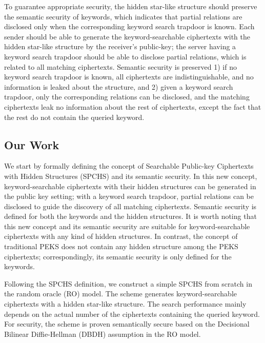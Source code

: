 \documentclass[10pt,twocolumn,twoside]{IEEEtran}
\begin{document}
To guarantee appropriate security, the hidden star-like structure should 
preserve the semantic security of keywords, which indicates that partial relations are disclosed only when the corresponding keyword search trapdoor is known. Each sender should be able to generate the keyword-searchable ciphertexts with the hidden star-like structure by the receiver's public-key; the server having a keyword search trapdoor should be able to disclose partial relations, which is related to all matching ciphertexts. Semantic security is preserved 1) if no keyword search trapdoor is
known, all ciphertexts are indistinguishable, and no information is leaked about the structure, and 2) given a keyword search trapdoor, only the corresponding relations can be disclosed, and the matching ciphertexts leak no information about the rest of ciphertexts, except the fact that the rest do not contain the queried keyword.

\subsection{Our Work}

We start by formally defining the concept of Searchable Public-key Ciphertexts with Hidden Structures (SPCHS) and its semantic security. In this new concept, keyword-searchable ciphertexts with their hidden structures can be generated in the public key setting; with a keyword search trapdoor, partial relations can be disclosed to guide the discovery of all matching ciphertexts. Semantic security is defined for both the keywords and the hidden structures. It is worth noting 
that this new concept and its semantic security are suitable for keyword-searchable ciphertexts with any kind of hidden structures. In contrast, the concept of traditional PEKS does not contain any hidden structure among the PEKS ciphertexts; correspondingly, its semantic security is only defined for the keywords. 

Following the SPCHS definition, we construct a simple SPCHS from scratch in the random oracle (RO) model. The scheme generates keyword-searchable ciphertexts with a hidden star-like structure. The search performance mainly depends on the actual number of the ciphertexts containing the queried keyword. For security, the scheme is proven semantically secure based on the Decisional Bilinear Diffie-Hellman (DBDH) assumption \cite{BB04} in the RO model.
\end{document}
